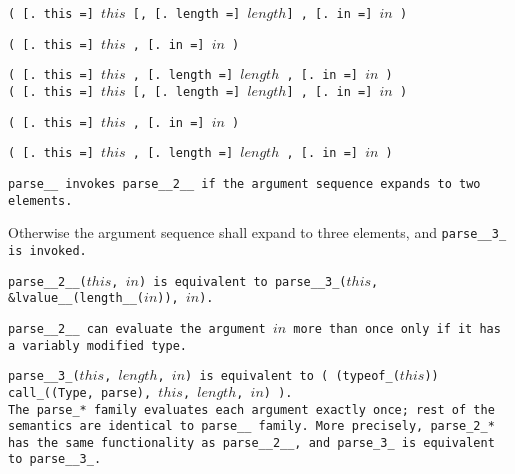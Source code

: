 
\s\s\s\s\tt{(} [\tt{. this =}] $this$ [\tt{,}
[\tt{. length =}] $length$] \tt{,} [\tt{. in =}] $in$ \tt{)}

\s\tt{(}  [\tt{. this =}] $this$
\phantom{[}\tt{,} [\tt{. in =}] $in$ \tt{)}

\s\s\tt{(} [\tt{. this =}] $this$ \phantom{[}\tt{,}
[\tt{. length =}] $length$\phantom{]} \tt{,} [\tt{. in =}] $in$ \tt{)}\\

\s\s\s\s\s\tt{(} [\tt{. this =}] $this$ [\tt{,}
[\tt{. length =}] $length$] \tt{,} [\tt{. in =}] $in$ \tt{)}

\s\s\s\tt{(} [\tt{. this =}] $this$
\phantom{[}\tt{,} [\tt{. in =}] $in$ \tt{)}

\s\s\s\tt{(} [\tt{. this =}] $this$ \phantom{[}\tt{,}
[\tt{. length =}] $length$\phantom{]} \tt{,} [\tt{. in =}] $in$ \tt{)}


\tt{parse__} invokes \tt{parse__2__} if the
argument sequence expands to two elements.

Otherwise the argument sequence shall expand to
three elements, and \tt{parse__3_} is invoked.

\tt{parse__2__(}$this$\tt{,} $in$\tt{)} is equivalent to
\tt{parse__3_(}$this$\tt{, &lvalue__(length__(}$in$\tt{)),} $in$\tt{)}.

\tt{parse__2__} can evaluate the argument $in$ more
than once only if it has a variably modified type.

\tt{parse__3_(}$this$\tt{,} $length$\tt{,} $in$\tt{)}
is equivalent to \tt{( (typeof_(}$this$\tt{))
call_((Type, parse),} $this$\tt{,} $length$\tt{,} $in$\tt{) )}.\\

The \tt{parse_}* family evaluates each argument exactly once;
rest of the semantics are identical to \tt{parse__} family.
More precisely, \tt{parse_2_}* has the same functionality as \tt{parse__2__},
and \tt{parse_3_} is equivalent to \tt{parse__3_}.
